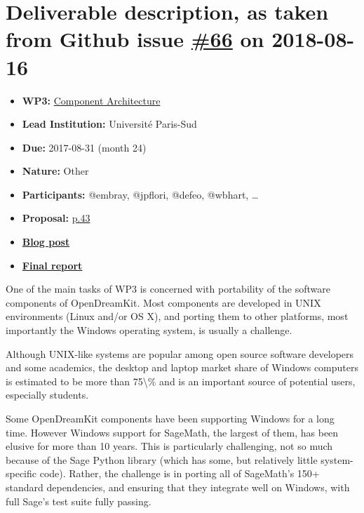 \section*{\texorpdfstring{Deliverable description, as taken from Github
issue
\href{https://github.com/OpenDreamKit/OpenDreamKit/issues/66}{\#66} on
2018-08-16}{Deliverable description, as taken from Github issue \#66 on 2018-08-16}}\label{deliverable-description-as-taken-from-github-issue-66-on-2018-08-16}

\begin{itemize}
\tightlist
\item
  \textbf{WP3:}
  \href{https://github.com/OpenDreamKit/OpenDreamKit/tree/master/WP3}{Component
  Architecture}
\item
  \textbf{Lead Institution:} Université Paris-Sud
\item
  \textbf{Due:} 2017-08-31 (month 24)
\item
  \textbf{Nature:} Other
\item
  \textbf{Participants:} @embray, @jpflori, @defeo, @wbhart, \ldots{}
\item
  \textbf{Proposal:}
  \href{https://github.com/OpenDreamKit/OpenDreamKit/raw/master/Proposal/proposal-www.pdf}{p.43}
\item
  \textbf{\href{http://opendreamkit.org/2017/10/11/SageWindows/}{Blog
  post}}
\item
  \textbf{\href{https://github.com/OpenDreamKit/OpenDreamKit/raw/master/WP3/D3.1/report-final.pdf}{Final
  report}}
\end{itemize}

One of the main tasks of WP3 is concerned with portability of the
software components of OpenDreamKit. Most components are developed in
UNIX environments (Linux and/or OS X), and porting them to other
platforms, most importantly the Windows operating system, is usually a
challenge.

Although UNIX-like systems are popular among open source software
developers and some academics, the desktop and laptop market share of
Windows computers is estimated to be more than 75\textbackslash{}\% and
is an important
source of potential users, especially students.

Some OpenDreamKit components have been supporting Windows for a long
time. However Windows support for SageMath, the largest of them, has
been elusive for more than 10 years. This is particularly challenging,
not so much because of the Sage Python library (which has some, but
relatively little system-specific code). Rather, the challenge is in
porting all of SageMath's 150+ standard dependencies, and ensuring
that
they integrate well on Windows, with full Sage's test suite fully
passing.

